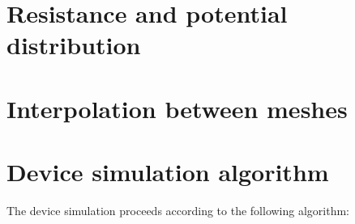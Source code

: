 \documentclass[10pt]{article}
\begin{document}


\section*{Resistance and potential distribution}

\section*{Interpolation between meshes}

\section*{Device simulation algorithm}

The device simulation proceeds according to the following algorithm:
\end{document}
